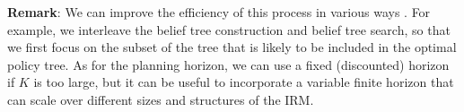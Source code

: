\documentclass[letterpaper, 10 pt, conference]{ieeeconf}  %
\newcommand{\ph}[1]{{\textbf{#1}:}} %
\newcommand{\todo}[1]{{\color{red} #1 }} %
\begin{document}
\ph{Remark} We can improve the efficiency of this process in various ways \cite{silver2010monte,somani2013despot,bonet1998learning,kim2019pomhdp}.
For example, we interleave the belief tree construction and belief tree search, so that we first focus on the subset of the tree that is likely to be included in the optimal policy tree. As for the planning horizon, we can use a fixed (discounted) horizon if $K$ is too large, but it can be useful to incorporate a variable finite horizon that can scale over different sizes and structures of the IRM.





\end{document}
